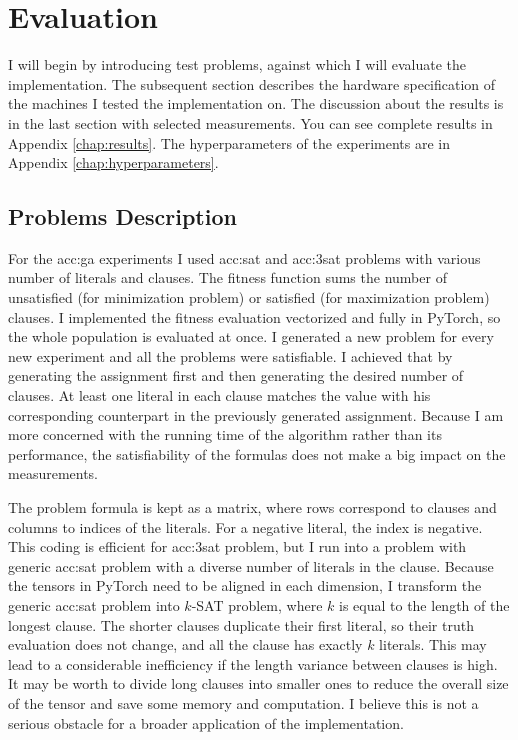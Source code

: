 \chapter{Evaluation}
\label{chap:eval}

I will begin by introducing test problems, against which I will evaluate the implementation. The subsequent section describes the hardware specification of the machines I tested the implementation on. The discussion about the results is in the last section with selected measurements. You can see complete results in Appendix \ref{chap:results}. The hyperparameters of the experiments are in Appendix \ref{chap:hyperparameters}.




\section{Problems Description}
\label{chap:problems}

For the \acrlong{acc:ga} experiments I used \acrshort{acc:sat} and \acrshort{acc:3sat} problems with various number of literals and clauses. The fitness function sums the number of unsatisfied (for minimization problem) or satisfied (for maximization problem) clauses. I implemented the fitness evaluation vectorized and fully in PyTorch, so the whole population is evaluated at once. I generated a new problem for every new experiment and all the problems were satisfiable. I achieved that by generating the assignment first and then generating the desired number of clauses. At least one literal in each clause matches the value with his corresponding counterpart in the previously generated assignment. Because I am more concerned with the running time of the algorithm rather than its performance, the satisfiability of the formulas does not make a big impact on the measurements.

The problem formula is kept as a matrix, where rows correspond to clauses and columns to indices of the literals. For a negative literal, the index is negative. This coding is efficient for \acrshort{acc:3sat} problem, but I run into a problem with generic \acrshort{acc:sat} problem with a diverse number of literals in the clause. Because the tensors in PyTorch need to be aligned in each dimension, I transform the generic \acrshort{acc:sat} problem into $k$-SAT problem, where $k$ is equal to the length of the longest clause. The shorter clauses duplicate their first literal, so their truth evaluation does not change, and all the clause has exactly $k$ literals. This may lead to a considerable inefficiency if the length variance between clauses is high. It may be worth to divide long clauses into smaller ones to reduce the overall size of the tensor and save some memory and computation. I believe this is not a serious obstacle for a broader application of the implementation.

